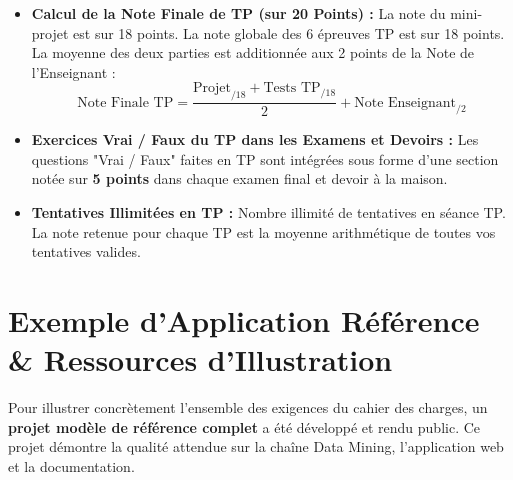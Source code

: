 \documentclass[11pt,a4paper]{article}
\begin{document}
\begin{tcolorbox}[colback=sintefblue!10, colframe=sintefblue, title=\textbf{INTÉGRATION DANS LA NOTE FINALE DE TP \& EXAMENS}, arc=2mm]
    \begin{itemize}[leftmargin=*]
        \item \textbf{Calcul de la Note Finale de TP (sur 20 Points) :} La note du mini-projet est sur 18 points. La note globale des 6 épreuves TP est sur 18 points. La moyenne des deux parties est additionnée aux 2 points de la Note de l'Enseignant :
        {\small $$\text{Note Finale TP} = \frac{\text{Projet}_{/18} + \text{Tests TP}_{/18}}{2} + \text{Note Enseignant}_{/2}$$}
        \item \textbf{Exercices Vrai / Faux du TP dans les Examens et Devoirs :} Les questions "Vrai / Faux" faites en TP sont intégrées sous forme d'une section notée sur \textbf{5 points} dans chaque examen final et devoir à la maison.
        \item \textbf{Tentatives Illimitées en TP :} Nombre illimité de tentatives en séance TP. La note retenue pour chaque TP est la moyenne arithmétique de toutes vos tentatives valides.
    \end{itemize}
\end{tcolorbox}

\section{Exemple d'Application Référence \& Ressources d'Illustration}

Pour illustrer concrètement l'ensemble des exigences du cahier des charges, un \textbf{projet modèle de référence complet} a été développé et rendu public. Ce projet démontre la qualité attendue sur la chaîne Data Mining, l'application web et la documentation.
\end{document}
